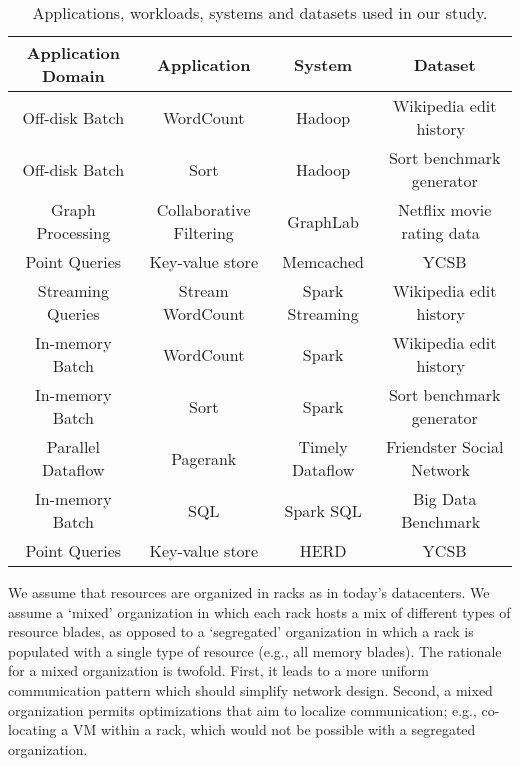 %
\begin{table*}
  \centering
  \small
  \begin{tabular}{c|c|c|c}
		\textbf{Application Domain} & \textbf{Application} & \textbf{System} & \textbf{Dataset} \\\hline \hline
		
    Off-disk Batch & WordCount & Hadoop & Wikipedia edit history~\cite{wikipedia}\\
     Off-disk Batch & Sort & Hadoop & Sort benchmark generator\\
     Graph Processing & Collaborative Filtering & GraphLab & Netflix movie rating data~\cite{netflix}\\
    Point Queries & Key-value store & Memcached & YCSB\\
    Streaming Queries & Stream WordCount & Spark Streaming & Wikipedia edit history~\cite{wikipedia}\\
    \hline
     \hline
     
    In-memory Batch & WordCount & Spark & Wikipedia edit history~\cite{wikipedia}\\
     In-memory Batch & Sort & Spark & Sort benchmark generator\\
     Parallel Dataflow & Pagerank & Timely Dataflow & Friendster Social Network~\cite{friendster}\\
     In-memory Batch & SQL & Spark SQL & Big Data Benchmark~\cite{bdb}\\
     Point Queries & Key-value store & HERD & YCSB\\\hline

    \hline
  \end{tabular}
  \vspace{0.1in}
  \caption{\small{Applications, workloads, systems and datasets used in our study.}}
  \label{tab:workloads}
\end{table*}
%
We assume that resources are organized in racks as in today's datacenters. 
We assume a `mixed' organization in which each rack hosts a mix of different types of resource blades, as opposed to a `segregated' organization in which a rack is populated with a single type of resource (e.g., all memory blades). The rationale for a mixed organization is twofold. 
First, it leads to a more uniform communication pattern which should simplify network design. 
Second, a mixed organization permits optimizations that aim to localize communication; e.g., co-locating a VM within a rack, which would not be possible with a segregated organization. 

